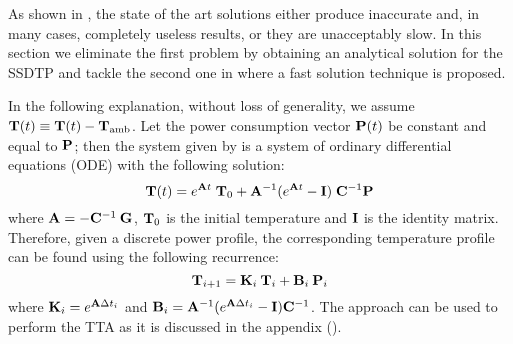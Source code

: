 As shown in , the state of the art solutions either produce inaccurate and, in many cases, completely useless results, or they are unacceptably slow. In this section we eliminate the first problem by obtaining an analytical solution for the SSDTP and tackle the second one in  where a fast solution technique is proposed.

In the following explanation, without loss of generality, we assume $\mathbf{T}(t) \equiv \mathbf{T}(t) - \mathbf{T}_\text{amb}$. Let the power consumption vector $\mathbf{P}(t)$ be constant and equal to $\mathbf{P}$; then the system given by  is a system of ordinary differential equations (ODE) with the following solution:
\begin{equation} \label{eq:solution}
  \mathbf{T}(t) = e^{\mathbf{A} t} \; \mathbf{T}_0 + \mathbf{A}^{-1} (e^{\mathbf{A} t} - \mathbf{I}) \; \mathbf{C}^{-1} \mathbf{P}
\end{equation}
where $\mathbf{A} = -\mathbf{C}^{-1} \: \mathbf{G}$, $\mathbf{T}_0$ is the initial temperature and $\mathbf{I}$ is the identity matrix. Therefore, given a discrete power profile, the corresponding temperature profile can be found using the following recurrence:
\begin{equation} \label{eq:recurrent-system}
  \mathbf{T}_{i+1} = \mathbf{K}_i \: \mathbf{T}_i + \mathbf{B}_i \: \mathbf{P}_i
\end{equation}
where $\mathbf{K}_i = e^{\mathbf{A} \Delta t_i}$ and $\mathbf{B}_i = \mathbf{A}^{-1}(e^{\mathbf{A} \Delta t_i} - \mathbf{I})\mathbf{C}^{-1}$. The approach can be used to perform the TTA as it is discussed in the appendix ().

